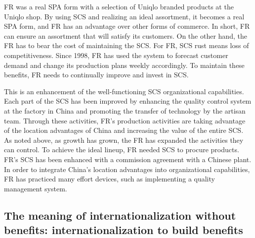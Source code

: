 \documentclass[12pt,a4paper]{article}
\begin{document}
FR was a real SPA form with a selection of Uniqlo branded products at
the Uniqlo shop. By using SCS and realizing an ideal assortment, it
becomes a real SPA form, and FR has an advantage over other forms of
commerce. In short, FR can ensure an assortment that will satisfy its
customers. On the other hand, the FR has to bear the cost of maintaining
the SCS. For FR, SCS rust means loss of competitiveness. Since 1998, FR
has used the system to forecast customer demand and change its
production plans weekly accordingly. To maintain these benefits, FR
needs to continually improve and invest in SCS.

This is an enhancement of the well-functioning SCS organizational
capabilities. Each part of the SCS has been improved by enhancing the
quality control system at the factory in China and promoting the
transfer of technology by the artisan team. Through these activities,
FR's production activities are taking advantage of the location
advantages of China and increasing the value of the entire SCS. As noted
above, as growth has grown, the FR has expanded the activities they can
control. To achieve the ideal lineup, FR needed SCS to procure products.
FR's SCS has been enhanced with a commission agreement with a Chinese
plant. In order to integrate China's location advantages into
organizational capabilities, FR has practiced many effort devices, such
as implementing a quality management system.

\hypertarget{the-meaning-of-internationalization-without-benefits-internationalization-to-build-benefits}{%
\subsection{The meaning of internationalization without benefits:
internationalization to build
benefits}\label{the-meaning-of-internationalization-without-benefits-internationalization-to-build-benefits}}
\end{document}
